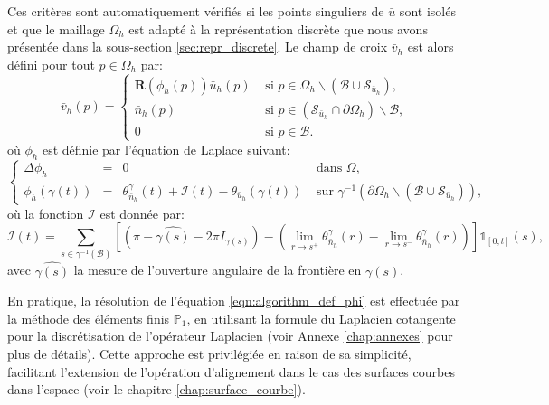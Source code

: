 Ces critères sont automatiquement vérifiés si les points singuliers de $\bar{u}$ sont isolés et que le maillage $\Omega_h$ est adapté à la représentation discrète que nous avons présentée dans la sous-section \ref{sec:repr_discrete}. Le champ de croix $\bar{v}_h$ est alors défini pour tout $p\in\Omega_h$ par:
\begin{equation}
\bar{v}_h(p)=
\left\{
\begin{array}{ll}
\mathbf{R}(\phi_h(p))\bar{u}_h(p) & \mbox{ si } p\in\Omega_h\backslash(\mathcal{B}\cup\mathcal{S}_{\bar{u}_h}),\\[0.5cm]
\bar{n}_h(p) & \mbox{ si } p\in(\mathcal{S}_{\bar{u}_h}\cap\partial\Omega_h)\backslash\mathcal{B},\\[0.5cm]
0 & \mbox{ si } p\in\mathcal{B}.
\end{array}
\right.
\label{eqn:etude_def_v_second}
\end{equation}
où $\phi_h$ est définie par l'équation de Laplace suivant:
\begin{equation}
\left\{
\begin{array}{lcll}
\Delta\phi_h &=& 0 &\mbox{ dans }\Omega,\\[0.5cm]
\phi_h(\gamma(t))&=&\theta_{\bar{n}_h}^\gamma(t)+\mathcal{I}(t)-\theta_{\bar{u}_h}(\gamma(t))& \mbox{ sur } \gamma^{-1}(\partial\Omega_h\backslash(\mathcal{B}\cup\mathcal{S}_{\bar{u}_h})),
\end{array}
\right.
\label{eqn:algorithm_def_phi}
\end{equation}
où la fonction $\mathcal{I}$ est donnée par:
$$
\mathcal{I}(t)=\displaystyle\sum_{s\in\gamma^{-1}(\mathcal{B})}\left[\left(\pi-\widehat{\gamma(s)}-2\pi I_{\gamma(s)}\right)-\left(\displaystyle\lim\limits_{r\rightarrow s^+}\theta^{\gamma}_{\bar{n}_h}(r) - \lim\limits_{r\rightarrow s^-}\theta^{\gamma}_{\bar{n}_h}(r)\right)\right]\mathbb{1}_{[0, t]}(s),
$$
avec $\widehat{\gamma(s)}$ la mesure de l'ouverture angulaire de la frontière en $\gamma(s)$.

En pratique, la résolution de l'équation \eqref{eqn:algorithm_def_phi} est effectuée par la méthode des éléments finis $\mathbb{P}_1$, en utilisant la formule du Laplacien cotangente pour la discrétisation de l'opérateur Laplacien \cite{solomon2014laplace, nealen2006laplacian, belkin2008discrete} (voir Annexe \ref{chap:annexes} pour plus de détails). Cette approche est privilégiée en raison de sa simplicité, facilitant l'extension de l'opération d'alignement dans le cas des surfaces courbes dans l'espace (voir le chapitre \ref{chap:surface_courbe}).

